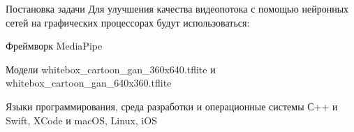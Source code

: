 \documentclass[aspectratio=169,xcolor=dvipsnames]{beamer}
\begin{document}

\begin{frame}{Постановка задачи}
    Для улучшения качества видеопотока с помощью нейронных сетей на графических процессорах будут использоваться:

    \begin{block}{Фреймворк}
        MediaPipe
    \end{block}

    \begin{block}{Модели}
        whitebox\_cartoon\_gan\_360x640.tflite и whitebox\_cartoon\_gan\_640x360.tflite
    \end{block}

    \begin{block}{Языки программирования, среда разработки и операционные системы}
        С++ и Swift, XCode и macOS, Linux, iOS
    \end{block}
\end{frame}


\end{document}

